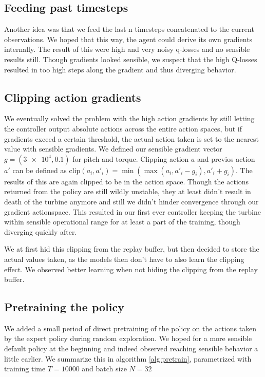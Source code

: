 \documentclass[hyperref,german,beleg]{cgvpub}
\begin{document}
\subsection{Feeding past timesteps}

Another idea was that we feed the last n timesteps concatenated to the current observations. We hoped that this way, the agent could derive its own gradients internally. The result of this were high and very noisy q-losses and no sensible results still. Though gradients looked sensible, we suspect that the high Q-losses resulted in too high steps along the gradient and thus diverging behavior. 

\subsection{Clipping action gradients}
\label{sec:clip_act_grad}
We eventually solved the problem with the high action gradients by still letting the controller output absolute actions across the entire action spaces, but if gradients exceed a certain threshold, the actual action taken is set to the nearest value with sensible gradients. We defined our sensible gradient vector $g = (\num{3e4}, 0.1)$ for pitch and torque. Clipping action $a$ and previos action $a'$ can be defined as $\mathrm{clip}(a_i, a'_i) = \min(\max(a_i, a'_i -g_i), a'_i + g_i)$. The results of this are again clipped to be in the action space. Though the actions returned from the policy are still wildly unstable, they at least didn't result in death of the turbine anymore and still we didn't hinder convergence through our gradient actionspace. This resulted in our first ever controller keeping the turbine within sensible operational range for at least a part of the training, though diverging quickly after.

We at first hid this clipping from the replay buffer, but then decided to store the actual values taken, as the models then don't have to also learn the clipping effect. We observed better learning when not hiding the clipping from the replay buffer.

\subsection{Pretraining the policy}

We added a small period of direct pretraining of the policy on the actions taken by the expert policy during random exploration. We hoped for a more sensible default policy at the beginning and indeed observed reaching sensible behavior a little earlier. We summarize this in algorithm \ref{alg:pretrain}, parametrized with training time $T=10000$ and batch size $N=32$
\end{document}
